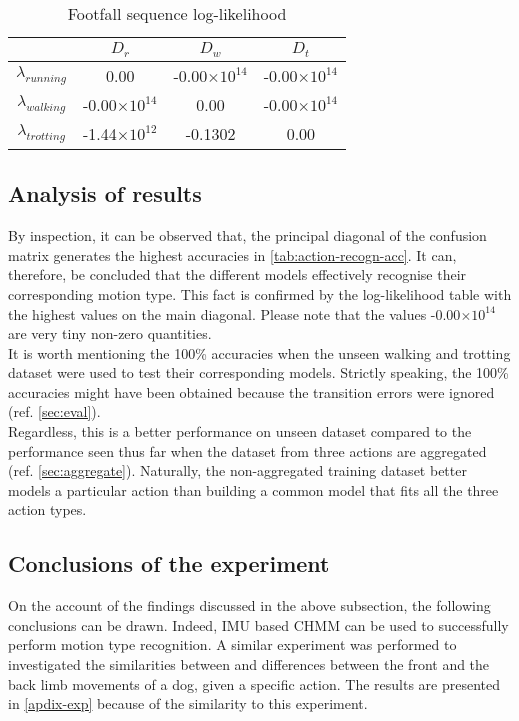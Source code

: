 \begin{table}[h!] 
	\centering
	\begin{tabular}{c|c|c|c} 	
		\hline	
		\hline
		& \(D_r\) &  \(D_w\) & \(D_t\)\\ 
		\hline
		\(\lambda_{running}\) & 0.00  & -0.00\(\times10^{14}\)   & -0.00\(\times10^{14}\)\\ 
		\hline
		\(\lambda_{walking}\)  & -0.00\(\times10^{14}\)  &  0.00  & -0.00\(\times10^{14}\)\\ 
		\hline
		\(\lambda_{trotting}\)  & -1.44\(\times10^{12}\)  &  -0.1302  & 0.00\\	
		\hline   	
	\end{tabular}
	\caption{Footfall sequence log-likelihood}
	\label{tab:action-recogn-log}
\end{table}

\subsection{Analysis of results}
By inspection, it can be observed that, the principal diagonal of the confusion matrix generates the highest accuracies in \ref{tab:action-recogn-acc}. It can, therefore, be concluded that the different models effectively recognise their corresponding motion type. This fact is confirmed by the log-likelihood table with the highest values on the main diagonal. Please note that the values -0.00\(\times10^{14}\) are very tiny non-zero quantities.\\
It is worth mentioning the 100\% accuracies when the unseen walking and trotting dataset were used to test their corresponding models. Strictly speaking, the 100\% accuracies might have been obtained because the transition errors were ignored (ref. \ref{sec:eval}). \\ Regardless, this is a better performance on unseen dataset compared to the performance seen thus far when the dataset from three actions are aggregated (ref. \ref{sec:aggregate}). Naturally, the non-aggregated training dataset better models a particular action than building a common model that fits all the three action types.

\subsection{Conclusions of the experiment}
On the account of the findings discussed in the above subsection, the following conclusions can be drawn.
Indeed, IMU based CHMM can be used to successfully perform motion type recognition. A similar experiment was performed to investigated the similarities between and differences between the front and the back limb movements of a dog, given a specific action. The results are presented in \ref{apdix-exp} because of the similarity to this experiment.


